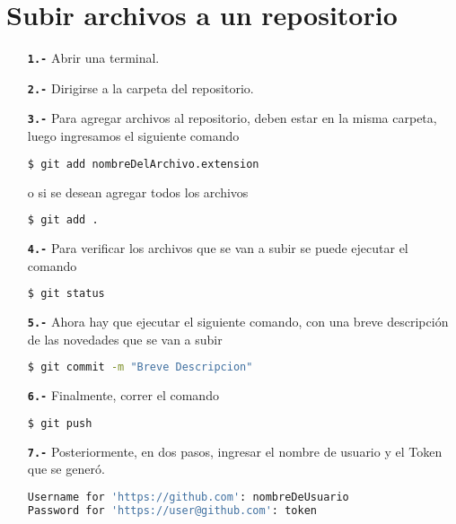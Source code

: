 \section{Subir archivos a un repositorio}
	\begin{itemize}
		\item[\textbf{\texttt{1.-}}] Abrir una terminal.
		\item[\textbf{\texttt{2.-}}] Dirigirse a la carpeta del repositorio.
		\item[\textbf{\texttt{3.-}}] Para agregar archivos al repositorio, deben estar en la misma carpeta, luego ingresamos el siguiente comando
		\begin{lstlisting}[language=bash, caption= Ejemplo. Agregar un archivo]
$ git add nombreDelArchivo.extension\end{lstlisting}
		o si se desean agregar todos los archivos
		\begin{lstlisting}[language=bash, caption= Ejemplo. Agregar todos los archivos]
$ git add .\end{lstlisting}
		\item[\textbf{\texttt{4.-}}] Para verificar los archivos que se van a subir se puede ejecutar el comando 
		\begin{lstlisting}[language=bash, caption= Ejemplo. Estatus del almacenaje]
$ git status\end{lstlisting}
		\item[\textbf{\texttt{5.-}}] Ahora hay que ejecutar el siguiente comando, con una breve descripción de las novedades que se van a subir
		\begin{lstlisting}[language=bash, caption= Ejemplo. Hacer commit]
$ git commit -m "Breve Descripcion"\end{lstlisting}
		\item[\textbf{\texttt{6.-}}] Finalmente, correr el comando 
		\begin{lstlisting}[language=bash, caption= Ejemplo. Subir al repositorio]
$ git push\end{lstlisting}
		\item[\textbf{\texttt{7.-}}] Posteriormente, en dos pasos, ingresar el nombre de usuario y el Token que se generó. 
		\begin{lstlisting}[language=bash, caption= Ejemplo. Subir al repositorio]       
Username for 'https://github.com': nombreDeUsuario
Password for 'https://user@github.com': token\end{lstlisting} 
	\end{itemize}
